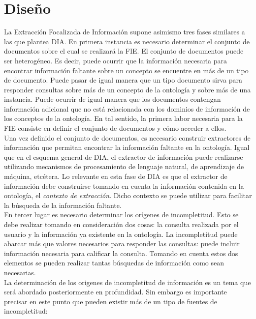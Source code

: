 \chapter{Diseño} \label{chap:diseno}

La Extracción Focalizada de Información supone asimismo tres fases similares a las que plantea DIA. En primera instancia es necesario determinar el conjunto de documentos sobre el cual se realizará la FIE. El conjunto de documentos puede ser heterogéneo. Es decir, puede ocurrir que la información necesaria para encontrar información faltante sobre un concepto se encuentre en más de un tipo de documento. Puede pasar de igual manera que un tipo documento sirva para responder consultas sobre más de un concepto de la ontología y sobre más de una instancia. Puede ocurrir de igual manera que los documentos contengan información adicional que no está relacionada con los dominios de información de los conceptos de la ontología. En tal sentido, la primera labor necesaria para la FIE consiste en definir el conjunto de documentos y cómo acceder a ellos. \\

Una vez definido el conjunto de documentos, es necesario construir extractores de información que permitan encontrar la información faltante en la ontología. Igual que en el esquema general de DIA, el extractor de información puede realizarse utilizando mecanismos de procesamiento de lenguaje natural, de aprendizaje de máquina, etcétera. Lo relevante en esta fase de DIA es que el extractor de información debe construirse tomando en cuenta la información contenida en la ontología, el \emph{contexto de extracción}. Dicho contexto se puede utilizar para facilitar la búsqueda de la información faltante.\\

En tercer lugar es necesario determinar los orígenes de incompletitud. Esto se debe realizar tomando en consideración dos cosas: la consulta realizada por el usuario y la información ya existente en la ontología. La incompletitud puede abarcar más que valores necesarios para responder las consultas: puede incluir información necesaria para calificar la consulta. Tomando en cuenta estos dos elementos se pueden realizar tantas búsquedas de información como sean necesarias. \\

La determinación de los origenes de incompletitud de información es un tema que será abordado posteriormente en profundidad. Sin embargo es importante precisar en este punto que pueden existir más de un tipo de fuentes de incompletitud:\\

